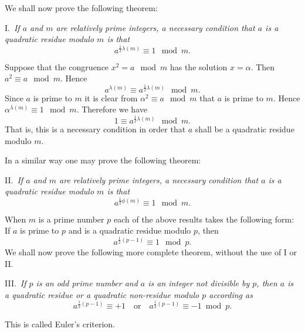 \documentclass[oneside]{book}
\begin{document}
We shall now prove the following theorem:

\smallskip I.~\emph{If $a$ and $m$ are relatively prime integers, a
necessary condition that $a$ is a quadratic residue modulo $m$ is
that}
\begin{equation*}
a^{\frac{1}{2}\lambda(m)} \equiv 1 \mod m.
\end{equation*}

Suppose that the congruence $x^2 = a \mod m$ has the solution $x =
\alpha$. Then $a^2 \equiv a \mod m$. Hence
\begin{equation*}
a^{\lambda(m)} \equiv a^{\frac{1}{2}\lambda(m)} \mod m.
\end{equation*}
Since $a$ is prime to $m$ it is clear from $\alpha^2 \equiv a \mod
m$ that $a$ is prime to $m$. Hence $\alpha^{\lambda(m)} \equiv 1
\mod m$. Therefore we have
\begin{equation*}
1 \equiv a^{\frac{1}{2}\lambda(m)} \mod m.
\end{equation*}
That is, this is a necessary condition in order that $a$ shall be a
quadratic residue modulo $m$.

In a similar way one may prove the following theorem:

\smallskip II.~\emph{If $a$ and $m$ are relatively prime integers, a
necessary condition that $a$ is a quadratic residue modulo $m$ is
that}
\begin{equation*}
a^{\frac{1}{2}\phi(m)} \equiv 1 \mod m.
\end{equation*}

When $m$ is a prime number $p$ each of the above results takes the
following form: If $a$ is prime to $p$ and is a quadratic residue
modulo $p$, then
\begin{equation*}
a^{\frac{1}{2}(p-1)} \equiv 1 \mod p.
\end{equation*}
We shall now prove the following more complete theorem, without the
use of I or II.

\smallskip III.~\emph{If $p$ is an odd prime number and $a$ is an
integer not divisible by $p$, then $a$ is a quadratic residue or a
quadratic non-residue modulo $p$ according as}
\begin{equation*}
a^{\tfrac{1}{2}(p-1)} \equiv +1 \quad \text{or} \quad
a^{\tfrac{1}{2}(p-1)} \equiv -1 \bmod p.
\end{equation*}

This is called Euler's criterion.
\end{document}
